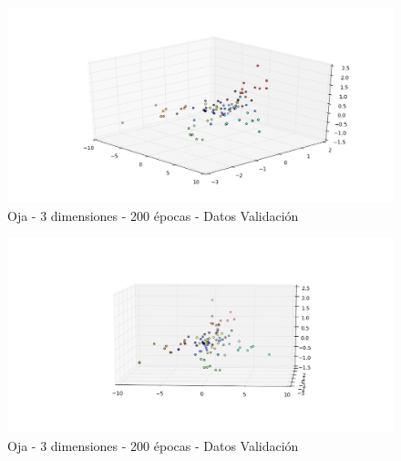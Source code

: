 \begin{figure}[h]
  \begin{center}
    \includegraphics[scale=0.6]{../img/ej1/oja/alt-oja_3salida_200ep_validation.png}
  \caption{Oja - 3 dimensiones - 200 épocas - Datos Validación}
  \end{center}
\end{figure}

\begin{figure}[h]
  \begin{center}
    \includegraphics[scale=0.6]{../img/ej1/oja/alt-oja_3salida_200ep_validation_2.png}
  \caption{Oja - 3 dimensiones - 200 épocas - Datos Validación}
  \end{center}
\end{figure}

